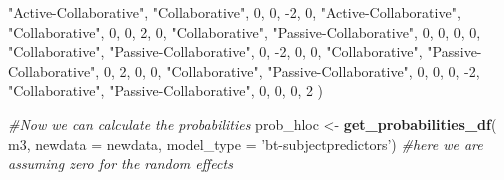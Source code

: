 \documentclass[
]{book}
\newenvironment{Shaded}{\begin{snugshade}}{\end{snugshade}}
\newcommand{\CommentTok}[1]{\textcolor[rgb]{0.56,0.35,0.01}{\textit{#1}}}
\newcommand{\DataTypeTok}[1]{\textcolor[rgb]{0.13,0.29,0.53}{#1}}
\newcommand{\DecValTok}[1]{\textcolor[rgb]{0.00,0.00,0.81}{#1}}
\newcommand{\KeywordTok}[1]{\textcolor[rgb]{0.13,0.29,0.53}{\textbf{#1}}}
\newcommand{\NormalTok}[1]{#1}
\newcommand{\StringTok}[1]{\textcolor[rgb]{0.31,0.60,0.02}{#1}}
\begin{document}
\begin{Shaded}
\begin{Highlighting}[]
                           \StringTok{"Active-Collaborative"}\NormalTok{, }\StringTok{"Collaborative"}\NormalTok{, }\DecValTok{0}\NormalTok{, }\DecValTok{0}\NormalTok{, }\DecValTok{-2}\NormalTok{, }\DecValTok{0}\NormalTok{,}
                           \StringTok{"Active-Collaborative"}\NormalTok{, }\StringTok{"Collaborative"}\NormalTok{, }\DecValTok{0}\NormalTok{, }\DecValTok{0}\NormalTok{, }\DecValTok{2}\NormalTok{, }\DecValTok{0}\NormalTok{,}
                           \StringTok{"Collaborative"}\NormalTok{, }\StringTok{"Passive-Collaborative"}\NormalTok{, }\DecValTok{0}\NormalTok{, }\DecValTok{0}\NormalTok{, }\DecValTok{0}\NormalTok{, }\DecValTok{0}\NormalTok{,}
                           \StringTok{"Collaborative"}\NormalTok{, }\StringTok{"Passive-Collaborative"}\NormalTok{, }\DecValTok{0}\NormalTok{, }\DecValTok{-2}\NormalTok{, }\DecValTok{0}\NormalTok{, }\DecValTok{0}\NormalTok{,}
                           \StringTok{"Collaborative"}\NormalTok{, }\StringTok{"Passive-Collaborative"}\NormalTok{, }\DecValTok{0}\NormalTok{, }\DecValTok{2}\NormalTok{, }\DecValTok{0}\NormalTok{, }\DecValTok{0}\NormalTok{,}
                           \StringTok{"Collaborative"}\NormalTok{, }\StringTok{"Passive-Collaborative"}\NormalTok{, }\DecValTok{0}\NormalTok{, }\DecValTok{0}\NormalTok{, }\DecValTok{0}\NormalTok{, }\DecValTok{-2}\NormalTok{,}
                           \StringTok{"Collaborative"}\NormalTok{, }\StringTok{"Passive-Collaborative"}\NormalTok{, }\DecValTok{0}\NormalTok{, }\DecValTok{0}\NormalTok{, }\DecValTok{0}\NormalTok{, }\DecValTok{2}
\NormalTok{                           )}

\CommentTok{#Now we can calculate the probabilities}
\NormalTok{prob_hloc <-}
\StringTok{  }\KeywordTok{get_probabilities_df}\NormalTok{(}
\NormalTok{    m3, }
    \DataTypeTok{newdata =}\NormalTok{ newdata,}
    \DataTypeTok{model_type =} \StringTok{'bt-subjectpredictors'}\NormalTok{) }\CommentTok{#here we are assuming zero for the random effects}
\end{Highlighting}
\end{Shaded}
\end{document}

